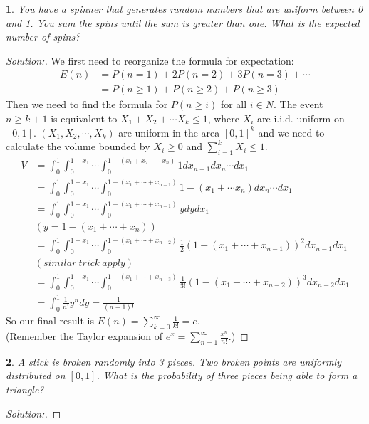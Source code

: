 \documentclass[10pt]{report}
\newtheorem{exe}{}[chapter]
\newenvironment{sol}{\begin{proof}[Solution:]}{\end{proof}}
\begin{document}
\begin{exe}
You have a spinner that generates random numbers that are uniform between 0 and 1. You sum the spins until the sum is greater than one. What is the expected number of spins?
\end{exe}
\begin{teacher}
\begin{sol}
We first need to reorganize the formula for expectation:\\
\begin{align*}
E(n) &= P(n=1) +2P(n=2) +3P(n=3)+\cdots \\
&=P(n\geq1) + P(n\geq 2) +P(n\geq3)
\end{align*}
Then we need to find the formula for $P(n\geq i)$ for all $i \in N$. The event $n\geq k+1$ is equivalent to $X_1+X_2+\cdots X_{k}\leq 1$, where $X_i$ are i.i.d. uniform on $[0,1]$. $(X_1, X_2, \cdots, X_k)$ are uniform in the area $[0,1]^k$ and we need to calculate the volume bounded by $X_i\geq 0$ and $\sum\limits_{i=1}^k X_i \leq 1$.
\begin{align*}
    V &=\int_0^1\int_0^{1-x_1}\cdots \int_0^{1-(x_1+x_2+\cdots x_n)} 1dx_{n+1}dx_n \cdots dx_1\\
    &=\int_0^1\int_0^{1-x_1}\cdots \int_0^{1-(x_1+\cdots +x_{n-1})}1-(x_1+\cdots x_n)dx_n\cdots dx_1\\
    &= \int_0^1\int_0^{1-x_1}\cdots \int_0^{1-(x_1+\cdots+x_{n-1})}ydydx_1\\
    & (y=1-(x_1+ \cdots +x_n)) \\
    &=\int_0^1\int_0^{1-x_1}\cdots \int_0^{1-(x_1+\cdots+x_{n-2})}\frac{1}{2}(1-(x_1+\cdots+x_{n-1}))^2dx_{n-1} dx_1\\
    &(similar\ trick\ apply)\\
    &=\int_0^1\int_0^{1-x_1}\cdots \int_0^{1-(x_1+\cdots+x_{n-3})}\frac{1}{3!}(1-(x_1+\cdots+x_{n-2}))^3dx_{n-2} dx_1\\
    &=\int_0^1 \frac{1}{n!}y^ndy = \frac{1}{(n+1)!}
\end{align*}
So our final result is $E(n)=\sum\limits_{k=0}^{\infty} \frac{1}{k!}=e$. \\
(Remember the Taylor expansion of $e^x = \sum\limits_{n=1}^{\infty} \frac{x^n}{n!}$.)
\end{sol}
\end{teacher}

\begin{exe}
A stick is broken randomly into 3 pieces. Two broken points are uniformly distributed on $[0,1]$. What is the probability of three pieces being able to form a triangle?
\end{exe}
\begin{teacher}
\begin{sol}
\end{sol}
\end{teacher}
\end{document}
